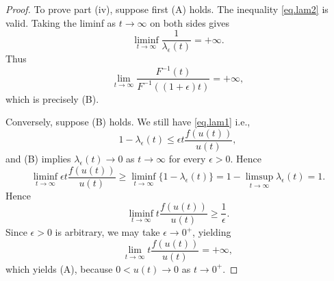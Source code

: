 \documentclass[a4paper,10pt,reqno]{amsart}
\numberwithin{equation}{section}
\theoremstyle{definition}
\theoremstyle{remark}
\DeclareMathOperator{\1}{\mathbbm 1}
\begin{document}
\begin{proof}
		To prove part (iv), suppose first (A) holds.
		The inequality \eqref{eq.lam2} is valid. Taking the liminf as $t\to\infty$ on both sides gives 
		\[
		\liminf_{t\to\infty}\frac{1}{\lambda_\epsilon(t)}=+\infty. 
		\]
		Thus 
		\[
		\lim_{t\to\infty} \frac{F^{-1}(t)}{F^{-1}((1+\epsilon)t)}=+\infty, 
		\]
		which is precisely (B). 
		
		Conversely, suppose (B) holds. We still have \eqref{eq.lam1} i.e., 
		\[
		1-\lambda_\epsilon(t)\leq \epsilon t \frac{f(u(t))}{u(t)},
		\]
		and (B) implies $\lambda_\epsilon(t)\to 0$ as $t\to\infty$ for every $\epsilon>0$. Hence 
		\[
		\liminf_{t\to\infty} \epsilon t \frac{f(u(t))}{u(t)}\geq 
		\liminf_{t\to\infty} \{	1-\lambda_\epsilon(t)\}=1-\limsup_{t\to\infty} \lambda_\epsilon(t)=1.
		\]
		Hence 
		\[
		\liminf_{t\to\infty} t \frac{f(u(t))}{u(t)} \geq \frac{1}{\epsilon}.
		\]
		Since $\epsilon>0$ is arbitrary, we may take $\epsilon\to 0^+$, yielding 
		\[
		\lim_{t\to\infty} t \frac{f(u(t))}{u(t)} =+\infty,
		\]
		which yields (A), because $0<u(t)\to 0$ as $t\to 0^+$.
	\end{proof}	
	
\end{document}
